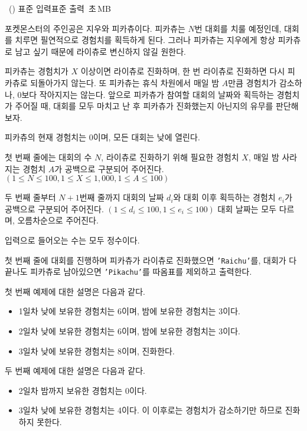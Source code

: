 \begin{problem}{\kcpcprobacronym\ (\kcpcprobacronymshort)}
    {표준 입력}{표준 출력}
    {\kcpcprobacronymtime\,초}{\kcpcprobacronymmemory\,MB}{}
    
    포켓몬스터의 주인공은 지우와 피카츄이다. 피카츄는 $N$번 대회를 치룰 예정인데, 대회를 치루면 필연적으로 경험치를 획득하게 된다. 그러나 피카츄는 지우에게 항상 피카츄로 남고 싶기 때문에 라이츄로 변신하지 않길 원한다.
    
    피카츄는 경험치가 $X$ 이상이면 라이츄로 진화하며, 한 번 라이츄로 진화하면 다시 피카츄로 되돌아가지 않는다. 또 피카츄는 휴식 차원에서 매일 밤 $A$만큼 경험치가 감소하나, 0보다 작아지지는 않는다. 앞으로 피카츄가 참여할 대회의 날짜와 획득하는 경험치가 주어질 때, 대회를 모두 마치고 난 후 피카츄가 진화했는지 아닌지의 유무를 판단해보자.
    
    피카츄의 현재 경험치는 0이며, 모든 대회는 낮에 열린다.
    
    \InputFile
    첫 번째 줄에는 대회의 수 $N$, 라이츄로 진화하기 위해 필요한 경험치 $X$, 매일 밤 사라지는 경험치 $A$가 공백으로 구분되어 주어진다. $(1 \leq N \leq 100, 1 \leq X \leq 1,000, 1 \leq A \leq 100)$
    
    두 번째 줄부터 $N + 1$번째 줄까지 대회의 날짜 $d_i$와 대회 이후 획득하는 경험치 $e_i$가 공백으로 구분되어 주어진다. $(1 \leq d_i \leq 100, 1 \leq e_i \leq 100)$ 대회 날짜는 모두 다르며, 오름차순으로 주어진다.

    입력으로 들어오는 수는 모두 정수이다. 
    
    \OutputFile
    첫 번째 줄에 대회를 진행하며 피카츄가 라이츄로 진화했으면 \texttt{'Raichu'}를, 대회가 다 끝나도 피카츄로 남아있으면 \texttt{'Pikachu'}를 따옴표를 제외하고 출력한다.
    
    \Examples
    \begin{example}
    \end{example}
    
    \Explanation
    첫 번째 예제에 대한 설명은 다음과 같다.
    \begin{itemize}
        \item 1일차 낮에 보유한 경험치는 6이며, 밤에 보유한 경험치는 3이다.
        \item 2일차 낮에 보유한 경험치는 6이며, 밤에 보유한 경험치는 3이다.
        \item 3일차 낮에 보유한 경험치는 8이며, 진화한다.
    \end{itemize}
    두 번째 예제에 대한 설명은 다음과 같다.
    \begin{itemize}
        \item 2일차 밤까지 보유한 경험치는 0이다.
        \item 3일차 낮에 보유한 경험치는 4이다. 이 이후로는 경험치가 감소하기만 하므로 진화하지 못한다.
    \end{itemize}
\end{problem}

